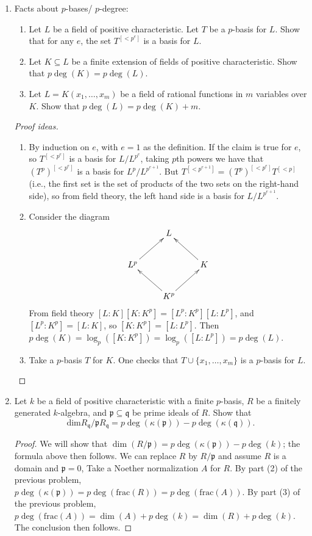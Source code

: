 \documentclass{amsart}[12pt]
\newcommand{\fp}{{\mathfrak p}}
\newcommand{\fq}{{\mathfrak q}}
\numberwithin{equation}{section}
\theoremstyle{plain} %
\theoremstyle{definition}
\theoremstyle{remark}
\begin{document}
\begin{enumerate}
\

\item Facts about $p$-bases/ $p$-degree:
 \begin{enumerate}
\item Let $L$ be a field of positive characteristic. 
Let $T$ be a $p$-basis for $L$. Show that for any $e$, the set $T^{[<p^e]}$ is a basis for $L$.
\item Let $K \subseteq L$ be a finite extension of fields of positive characteristic. Show that $p\deg(K)=p\deg(L)$.
\item Let $L=K(x_1,\dots,x_m)$ be a field of rational functions in $m$ variables over $K$. Show that $p\deg(L) = p\deg(K) +m$.
\end{enumerate}


\begin{proof}[Proof ideas] 
\begin{enumerate}
\item By induction on $e$, with $e=1$ as the definition. If the claim is true for $e$, so $T^{[<p^e]}$ is a basis for $L/L^{p^e}$, taking $p$th powers we have that $(T^p)^{[<p^e]}$ is a basis for $L^p / L^{p^{e+1}}$. But $T^{[<p^{e+1}]} = (T^p)^{[<p^e]} T^{[<p]}$ (i.e., the first set is the set of products of the two sets on the right-hand side), so from field theory, the left hand side is a basis for $L/ L^{p^{e+1}}$.
\item Consider the diagram
\[ \xymatrix{  & L & \\ L^p \ar[ur] & & K \ar[ul] \\ & K^p  \ar[ur]  \ar[ul] &  }\]
From field theory $[L:K][K:K^p] = [L^p : K^p][L:L^p]$, and $[L^p : K^p] = [L:K]$, so $[K:K^p] = [L:L^p]$. Then $p\deg(K)=\log_p([K:K^p]) = \log_p([L:L^p]) = p\deg(L)$.
\item Take a $p$-basis $T$ for $K$. One checks that $T \cup \{x_1,\dots,x_m\}$ is a $p$-basis for $L$.
\end{enumerate}
\end{proof}


\item Let $k$ be a field of positive characteristic with a finite $p$-basis, $R$ be a finitely generated $k$-algebra, and $\fp \subseteq \fq$ be prime ideals of $R$.
Show that 
\[ \mathrm{dim} R_\fq / \fp R_\fq = p\deg(\kappa(\fp)) - p\deg(\kappa(\fq)).\]


\begin{proof}
We will show that $\dim(R/\fp) = p\deg(\kappa(\fp)) - p\deg(k)$; the formula above then follows.
We can replace $R$ by $R/\fp$ and assume $R$ is a domain and $\fp=0$,  Take a Noether normalization $A$ for $R$. By part (2) of the previous problem, $p\deg(\kappa(\fp)) = p\deg(\mathrm{frac}(R)) = p\deg(\mathrm{frac}(A))$. By part (3) of the previous problem, $p\deg(\mathrm{frac}(A)) = \dim(A) + p\deg(k) =  \dim(R) + p\deg(k)$. The conclusion then follows.
\end{proof}


\end{enumerate}
\end{document}
